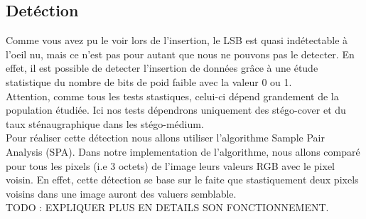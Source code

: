 \documentclass[letterpaper,12pt, french]{article}
\begin{document}
\subsection{Detéction}
\label{sec:org8769101}
Comme vous avez pu le voir lors de l'insertion, le LSB est quasi indétectable à l'oeil nu, mais ce n'est pas pour autant que nous ne pouvons pas le detecter. En effet, il est possible de detecter l'insertion de données grâce à une étude statistique du nombre de bits de poid faible avec la valeur 0 ou 1. 
\vspace{1\baselineskip}
\\
Attention, comme tous les tests stastiques, celui-ci dépend grandement de la population étudiée. Ici nos tests dépendrons
uniquement des stégo-cover et du taux sténaugraphique dans les stégo-médium.
\vspace{1\baselineskip}
\\
Pour réaliser cette détection nous allons utiliser l'algorithme Sample Pair Analysis (SPA). Dans notre implementation de l'algorithme, nous allons comparé pour tous les pixels (i.e 3 octets) de l'image leurs valeurs RGB avec le pixel voisin. En effet, cette détection se base sur le faite que stastiquement deux pixels voisins dans une image auront des valuers semblable. 
\vspace{1\baselineskip}
\\
TODO : EXPLIQUER PLUS EN DETAILS SON FONCTIONNEMENT.

\pagebreak
\end{document}
